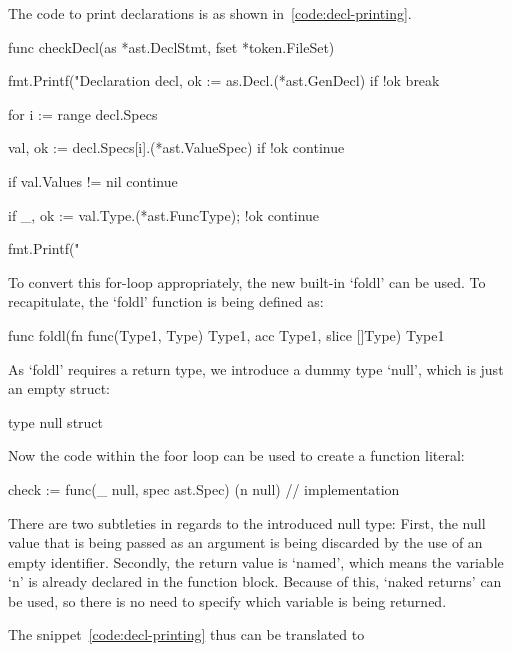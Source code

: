 The code to print declarations is as shown in~\ref{code:decl-printing}.

\begin{code}
	\label{code:decl-printing}
\begin{gocode}
func checkDecl(as *ast.DeclStmt, fset *token.FileSet) {
	fmt.Printf("Declaration %
	decl, ok := as.Decl.(*ast.GenDecl)
	if !ok {
		break
	}

	for i := range decl.Specs {
		val, ok := decl.Specs[i].(*ast.ValueSpec)
		if !ok {
			continue
		}

		if val.Values != nil {
			continue
		}

		if _, ok := val.Type.(*ast.FuncType); !ok {
			continue
		}

		fmt.Printf("\tIdent %
	}
}
\end{gocode}
\end{code}
To convert this for-loop appropriately, the new built-in `foldl' can be used.
To recapitulate, the `foldl' function is being defined as:
\begin{gocode}
func foldl(fn func(Type1, Type) Type1, acc Type1, slice []Type) Type1
\end{gocode}
As `foldl' requires a return type, we introduce a dummy type `null', which
is just an empty struct:
\begin{gocode}
type null struct{}
\end{gocode}
Now the code within the foor loop can be used to create a function literal:
\begin{gocode}
check := func(_ null, spec ast.Spec) (n null) {
	// implementation
}
\end{gocode}
There are two subtleties in regards to the introduced null type:
First, the null value that is being passed as an argument is being discarded
by the use of an empty identifier.
Secondly, the return value is `named', which means the variable `n' is
already declared in the function block. Because of this, `naked returns' can
be used, so there is no need to specify which variable is being returned.

The snippet~\ref{code:decl-printing} thus can be translated to

